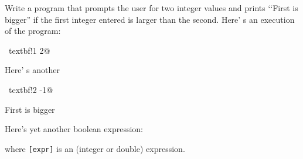 Write a program that prompts the user for two integer values and prints \lq\lq First is bigger'' if the first integer entered is larger than the second. Here' s an execution of the program:

\begin{console}[commandchars=\~\!\@]

~textbf!1 2@

\end{console}

Here' s another



\begin{console}[commandchars=\~\!\@]

~textbf!2 -1@ 

First is bigger

\end{console}



Here's yet another boolean expression:



\begin{center}

\EMPHASIZE{[expr] [bool op] [value]}

\end{center}



where \verb![expr]! is an (integer or double) expression.


